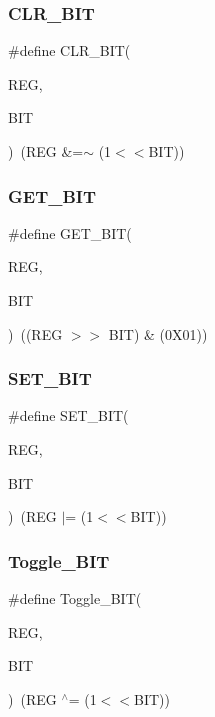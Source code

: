 \subsubsection{C\+L\+R\+\_\+\+B\+IT}
{\footnotesize\ttfamily \#define C\+L\+R\+\_\+\+B\+IT(\begin{DoxyParamCaption}\item[{}]{R\+EG,  }\item[{}]{B\+IT }\end{DoxyParamCaption})~(R\+EG \&=$\sim$ (1$<$$<$B\+IT))}

\mbox{\label{_b_i_t___math_8h_ac6ee02a427612497aa94621a3c7a6e27}} 
\subsubsection{G\+E\+T\+\_\+\+B\+IT}
{\footnotesize\ttfamily \#define G\+E\+T\+\_\+\+B\+IT(\begin{DoxyParamCaption}\item[{}]{R\+EG,  }\item[{}]{B\+IT }\end{DoxyParamCaption})~((R\+EG $>$$>$ B\+IT) \& (0\+X01))}

\mbox{\label{_b_i_t___math_8h_a26474f43799fbade9cf300e21dd3a91a}} 
\subsubsection{S\+E\+T\+\_\+\+B\+IT}
{\footnotesize\ttfamily \#define S\+E\+T\+\_\+\+B\+IT(\begin{DoxyParamCaption}\item[{}]{R\+EG,  }\item[{}]{B\+IT }\end{DoxyParamCaption})~(R\+EG $\vert$= (1$<$$<$B\+IT))}

\mbox{\label{_b_i_t___math_8h_aa7d224224f820f5efd6471e1b18bc197}} 
\subsubsection{Toggle\+\_\+\+B\+IT}
{\footnotesize\ttfamily \#define Toggle\+\_\+\+B\+IT(\begin{DoxyParamCaption}\item[{}]{R\+EG,  }\item[{}]{B\+IT }\end{DoxyParamCaption})~(R\+EG $^\wedge$= (1$<$$<$B\+IT))}

